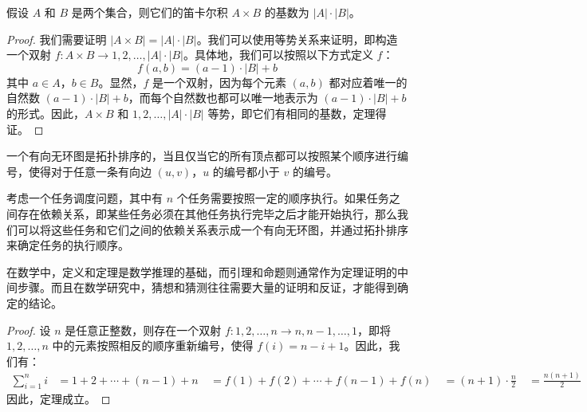 \begin{assume}
假设 $A$ 和 $B$ 是两个集合，则它们的笛卡尔积 $A \times B$ 的基数为 $|A| \cdot |B|$。
\end{assume}

\begin{proof}
我们需要证明 $|A \times B| = |A| \cdot |B|$。我们可以使用等势关系来证明，即构造一个双射 $f: A \times B \rightarrow {1,2,\dots,|A| \cdot |B|}$。具体地，我们可以按照以下方式定义 $f$：
\begin{equation}
    f(a,b)=(a-1)\cdot |B|+b
\end{equation}
其中 $a \in A$，$b \in B$。显然，$f$ 是一个双射，因为每个元素 $(a,b)$ 都对应着唯一的自然数 $(a-1) \cdot |B| + b$，而每个自然数也都可以唯一地表示为 $(a-1) \cdot |B| + b$ 的形式。因此，$A \times B$ 和 ${1,2,\dots,|A| \cdot |B|}$ 等势，即它们有相同的基数，定理得证。
\end{proof}

\begin{dfn}
一个有向无环图是拓扑排序的，当且仅当它的所有顶点都可以按照某个顺序进行编号，使得对于任意一条有向边 $(u,v)$，$u$ 的编号都小于 $v$ 的编号。
\end{dfn}

\begin{exmp}
考虑一个任务调度问题，其中有 $n$ 个任务需要按照一定的顺序执行。如果任务之间存在依赖关系，即某些任务必须在其他任务执行完毕之后才能开始执行，那么我们可以将这些任务和它们之间的依赖关系表示成一个有向无环图，并通过拓扑排序来确定任务的执行顺序。
\end{exmp}

\begin{rem}
在数学中，定义和定理是数学推理的基础，而引理和命题则通常作为定理证明的中间步骤。而且在数学研究中，猜想和猜测往往需要大量的证明和反证，才能得到确定的结论。
\end{rem}

\begin{proof}
设 $n$ 是任意正整数，则存在一个双射 $f: {1,2,\dots,n} \rightarrow {n,n-1,\dots,1}$，即将 ${1,2,\dots,n}$ 中的元素按照相反的顺序重新编号，使得 $f(i) = n-i+1$。因此，我们有：
\begin{align*}
\sum_{i=1}^n i &= 1 + 2 + \cdots + (n-1) + n \
&= f(1) + f(2) + \cdots + f(n-1) + f(n) \
&= (n+1) \cdot \frac{n}{2} \
&= \frac{n(n+1)}{2}
\end{align*}
因此，定理成立。
\end{proof}

